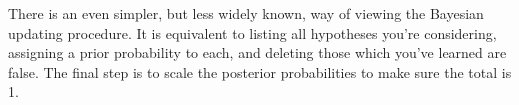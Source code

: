 \documentclass[a4paper, 12pt]{article}
\begin{document}
There is an even simpler, but less widely known,
way of viewing the Bayesian updating procedure. It is equivalent to listing
all hypotheses you're considering, assigning a prior probability to each, and
deleting those which you've learned are false. The final step is to scale the
posterior probabilities to make sure the total is 1.












\end{document}
